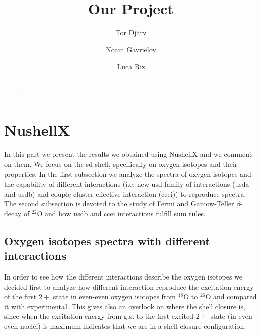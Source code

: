 \documentclass{llncs}
\begin{document}
\title{Our Project}
%
%
\author{Tor Dj\"{a}rv \and Noam Gavrielov\and Luca Riz}
%
%
%

\maketitle              %

\begin{abstract}
\dots
{}
\end{abstract}
%
\section{NushellX}
%
%
In this part we present the results we obtained using NushellX \cite{nush} and we comment on them. We focus  on the sd-shell, specifically on oxygen isotopes and their properties. In the first subsection we analyze the spectra of oxygen isotopes and the capability of different interactions (i.e. new-usd family of interactions \cite{usd} (usda and usdb) and couple cluster effective interaction \cite{ccei} (ccei)) to reproduce spectra. The second subsection is devoted to the study of Fermi and Gamow-Teller $\beta$-decay of $^{22}$O and how usdb and ccei interactions fulfill sum rules.

\subsection{Oxygen isotopes spectra with different interactions}
%
In order to see how the different interactions describe the oxygen isotopes we decided first to analyze how different interaction reproduce the excitation energy of the first $2+$ state in even-even oxygen isotopes from $^{18}$O to $^{26}$O and compared it with experimental. This gives also an overlook on where the shell closure is, since when the excitation energy from g.s. to the first excited $2+$ state (in even-even nuclei) is maximum indicates that we are in a shell closure configuration.
\end{document}
